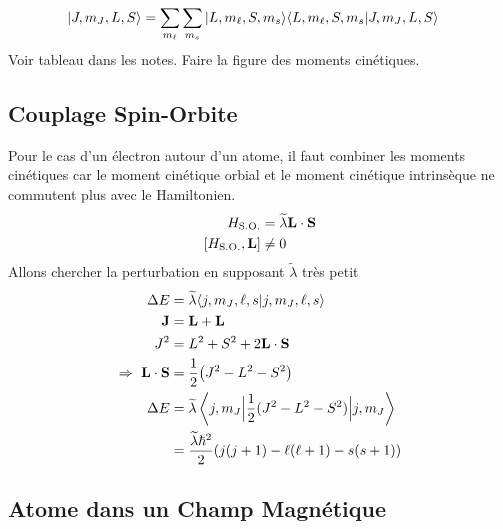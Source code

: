 \begin{align}
    |{J,m_J,L,S}\rangle
    &=
    \sum_{m_\ell}\sum_{m_s}
    |{L,m_\ell,S,m_s}\rangle\langle{L,m_\ell,S,m_s}|{J,m_J,L,S}\rangle
\end{align}
Voir tableau dans les notes.
Faire la figure des moments cinétiques.

\subsection{Couplage Spin-Orbite} %
\label{sub:Couplage Spin-Orbite}

Pour le cas d'un électron autour d'un atome, il faut combiner les moments
cinétiques car le moment cinétique orbial et le moment cinétique intrinsèque
ne commutent plus avec le Hamiltonien.
\begin{align}
    H_{\rm S.O.}&=\widetilde{\lambda}\vb{L}\cdot\vb{S}\\
    [H_{\rm S.O.},\vb{L}]&\neq0
\end{align}
Allons chercher la perturbation en supposant $\widetilde{\lambda}$ très petit
\begin{align}
    \Delta E
    &=\widetilde{\lambda}\langle{j,m_J,\ell,s}|{j,m_J,\ell,s}\rangle\\
    \vb{J}&=\vb{L}+\vb{L}\\
    J^2&=L^2+S^2+2\vb{L}\cdot\vb{S}\\
    \Rightarrow\ \vb{L}\cdot\vb{S}
       &=\frac12\qty(J^2-L^2-S^2)\\
    \Delta E
       &=\widetilde{\lambda}\expval{j,m_J\Big|\frac12(J^2-L^2-S^2)\Big|j,m_J}\\
       &=\frac{\widetilde{\lambda}\hbar^2}{2}\qty(j(j+1)-\ell(\ell+1)-s(s+1))
\end{align}


\subsection{Atome dans un Champ Magnétique} %
\label{sub:Atome dans un Champ Magnétique}

